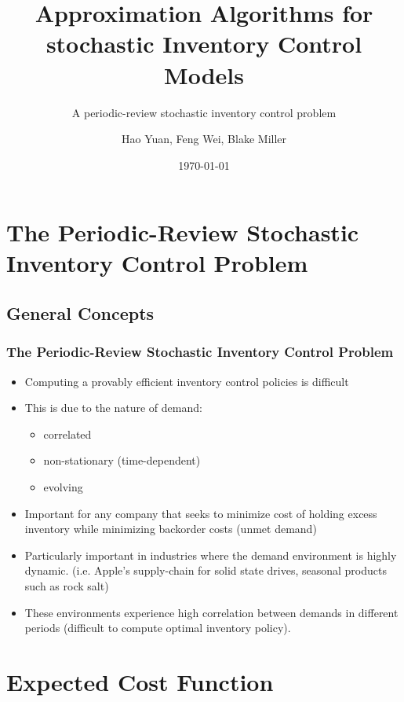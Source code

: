 \documentclass{beamer}
\title{Approximation Algorithms for stochastic Inventory Control Models}
\subtitle{A periodic-review stochastic inventory control problem}
\author{Hao Yuan, Feng Wei, Blake Miller}
\date{\today}
\begin{document}
  \frame{\titlepage}
  \section{The Periodic-Review Stochastic Inventory Control Problem}
  \subsection{General Concepts}
  \begin{frame}
    \frametitle{The Periodic-Review Stochastic Inventory Control Problem}
    \begin{itemize}
      \item Computing a provably efficient inventory control policies is difficult
      \item This is due to the nature of demand:
        \begin{itemize}
          \item correlated
          \item non-stationary (time-dependent)
          \item evolving
        \end{itemize}
      \item Important for any company that seeks to minimize cost of holding excess inventory while minimizing backorder costs (unmet demand)
      \item Particularly important in industries where the demand environment is highly dynamic. (i.e. Apple's supply-chain for solid state drives, seasonal products such as rock salt)
      \item These environments experience high correlation between demands in different periods (difficult to compute optimal inventory policy).
    \end{itemize}
  \end{frame}

  \section{Expected Cost Function}
\end{document}
